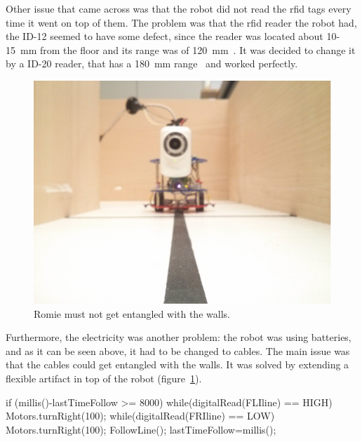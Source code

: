 Other issue that came across was that the robot did not read the \acrshort{rfid} tags every time it
went on top of them. The problem was that the \acrshort{rfid} reader the robot had, the ID-12 seemed
to have some defect, since the reader was located about 10-15~mm from the floor and its range was of
120~mm~\cite{rfid}. It was decided to change it by a ID-20 reader, that has a 180~mm
range~\cite{rfid} and worked perfectly.

\begin{figure}[!htbp]
	\centering
	\includegraphics[height=0.35\textheight]{fig/lines.jpg}
	\caption{Romie must not get entangled with the walls.}
	\label{fig:lines}
\end{figure}

Furthermore, the electricity was another problem: the robot was using batteries, and as it can be
seen above, it had to be changed to cables. The main issue was that the cables could get entangled
with the walls. It was solved by extending a flexible artifact in top of the robot
(figure~\ref{fig:lines}).

\begin{center}
\begin{minipage}{.9\textwidth}
\singlespace
{}
\begin{pyglist}[language=c, caption={Arduino code for returning if wall was hit.},
	label={alg:romie_wall}, listingname={Algorithm}, numbers=left]
if (millis()-lastTimeFollow >= 8000) {
    while(digitalRead(FLIline) == HIGH) Motors.turnRight(100);
    while(digitalRead(FRIline) == LOW) Motors.turnRight(100);
    FollowLine();
    lastTimeFollow=millis();
}
\end{pyglist}
\end{minipage}
\end{center}

